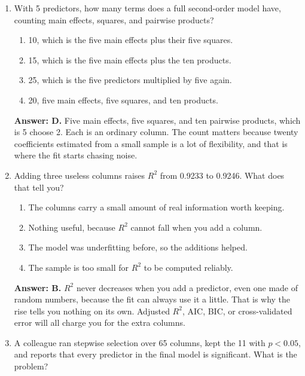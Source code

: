 \documentclass[11pt]{article}
\begin{document}
\begin{enumerate}[itemsep=14pt]
\item With 5 predictors, how many terms does a full second-order model have, counting main effects, squares, and pairwise products?

\begin{enumerate}[label=\Alph*., itemsep=1pt, topsep=3pt]
  \item 10, which is the five main effects plus their five squares.
  \item 15, which is the five main effects plus the ten products.
  \item 25, which is the five predictors multiplied by five again.
  \item 20, five main effects, five squares, and ten products.
\end{enumerate}

\vspace{2pt}
\textbf{Answer: D.} Five main effects, five squares, and ten pairwise products, which is 5 choose 2. Each is an ordinary column. The count matters because twenty coefficients estimated from a small sample is a lot of flexibility, and that is where the fit starts chasing noise.
\vspace{4pt}

\item Adding three useless columns raises $R^2$ from 0.9233 to 0.9246. What does that tell you?

\begin{enumerate}[label=\Alph*., itemsep=1pt, topsep=3pt]
  \item The columns carry a small amount of real information worth keeping.
  \item Nothing useful, because $R^2$ cannot fall when you add a column.
  \item The model was underfitting before, so the additions helped.
  \item The sample is too small for $R^2$ to be computed reliably.
\end{enumerate}

\vspace{2pt}
\textbf{Answer: B.} $R^2$ never decreases when you add a predictor, even one made of random numbers, because the fit can always use it a little. That is why the rise tells you nothing on its own. Adjusted $R^2$, AIC, BIC, or cross-validated error will all charge you for the extra columns.
\vspace{4pt}

\item A colleague ran stepwise selection over 65 columns, kept the 11 with $p < 0.05$, and reports that every predictor in the final model is significant. What is the problem?


\end{enumerate}
\end{document}
